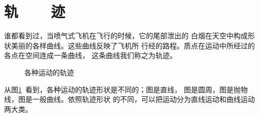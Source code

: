 \section[轨迹]{轨~~~~迹}\label{sec:01.05}

谁都看到过，当喷气式飞机在飞行的时候，它的尾部泄出的
白烟在天空中构成形状美丽的各样曲线。这些曲线反映了飞机所
行经的路程。质点在运动中所经过的各点在空间连成一条曲线，
这条曲线我们称之为轨迹。

\begin{figure}[!h]
    \hspace{3em}
    \hspace{3em}

    \hspace{3.7em}
    \hspace{1.3em}
    \caption{各种运动的轨迹}
    \label{fig:01.06}
\end{figure}

\clearpage

从图\ref{fig:01.06}~看到，各种运动的轨迹形状是不同的；图是直线，
图是圆周，图是抛物线，图是一般曲线。依照轨迹形状
的不同，可以把运动分为直线运动和曲线运动两大类。

